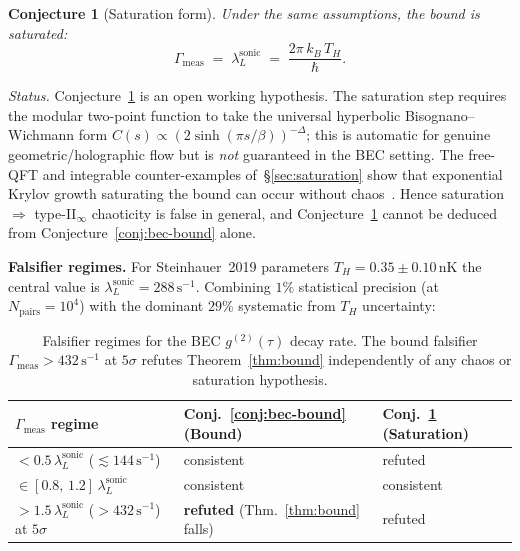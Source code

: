 \documentclass[12pt,a4paper]{article}
\newtheorem{conjecture}{Conjecture}
\begin{document}
\begin{conjecture}[Saturation form]
\label{conj:bec-sat}
Under the same assumptions, the bound is saturated:
\begin{equation}
  \Gamma_{\mathrm{meas}} \;=\; \lambda_L^{\mathrm{sonic}}
    \;=\; \frac{2\pi\,k_B\,T_H}{\hbar}.
  \label{eq:bec-sat-conj}
\end{equation}
\end{conjecture}

\noindent\emph{Status.}
Conjecture~\ref{conj:bec-sat} is an open working hypothesis.
The saturation step requires the modular two-point function to take
the universal hyperbolic Bisognano--Wichmann form
$C(s) \propto (2\sinh(\pi s/\beta))^{-\Delta}$; this is automatic for
genuine geometric/holographic flow but is \emph{not} guaranteed in
the BEC setting.
The free-QFT and integrable counter-examples of~\S\ref{sec:saturation}
show that exponential Krylov growth saturating the bound can occur
without chaos~\cite{AvdoshkinDymarsky2019,Camargo2023,Sreeram2025}.
Hence saturation $\Rightarrow$ type-II$_\infty$ chaoticity is false in
general, and Conjecture~\ref{conj:bec-sat} cannot be deduced from
Conjecture~\ref{conj:bec-bound} alone.

\medskip
\noindent\textbf{Falsifier regimes.}
For Steinhauer~2019 parameters $T_H = 0.35\pm 0.10\,\mathrm{nK}$
the central value is $\lambda_L^{\mathrm{sonic}} = 288\,\mathrm{s}^{-1}$.
Combining $1\%$ statistical precision (at $N_{\mathrm{pairs}} = 10^4$)
with the dominant $29\%$ systematic from $T_H$ uncertainty:

\begin{table}[h]
\centering
\begin{tabular}{lll}
\toprule
$\Gamma_{\mathrm{meas}}$ regime & Conj.~\ref{conj:bec-bound} (Bound) &
   Conj.~\ref{conj:bec-sat} (Saturation) \\
\midrule
$< 0.5\,\lambda_L^{\mathrm{sonic}}$ ($\lesssim 144\,\mathrm{s}^{-1}$) & consistent & refuted \\
$\in [0.8,\,1.2]\,\lambda_L^{\mathrm{sonic}}$ & consistent & consistent \\
$> 1.5\,\lambda_L^{\mathrm{sonic}}$ ($> 432\,\mathrm{s}^{-1}$) at $5\sigma$
  & \textbf{refuted} (Thm.~\ref{thm:bound} falls) & refuted \\
\bottomrule
\end{tabular}
\caption{Falsifier regimes for the BEC $g^{(2)}(\tau)$ decay rate.
The bound falsifier $\Gamma_{\mathrm{meas}} > 432\,\mathrm{s}^{-1}$
at $5\sigma$ refutes Theorem~\ref{thm:bound} independently of any
chaos or saturation hypothesis.}
\label{tab:bec-falsifier}
\end{table}
\end{document}

